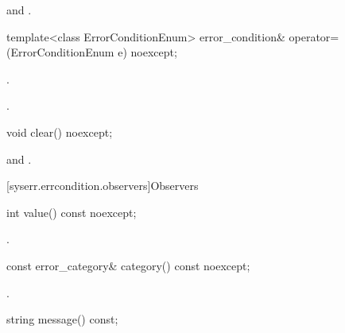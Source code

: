 \begin{itemdescr}
\pnum
\ensures {} and .
\end{itemdescr}

%
\begin{itemdecl}
template<class ErrorConditionEnum>
  error_condition& operator=(ErrorConditionEnum e) noexcept;
\end{itemdecl}

\begin{itemdescr}
\pnum
\ensures {}.

\pnum
\returns {}.

\pnum
{}

\end{itemdescr}

%
\begin{itemdecl}
void clear() noexcept;
\end{itemdecl}

\begin{itemdescr}
\pnum
\ensures {} and .
\end{itemdescr}

[syserr.errcondition.observers]{Observers}

%
\begin{itemdecl}
int value() const noexcept;
\end{itemdecl}

\begin{itemdescr}
\pnum
\returns {}.
\end{itemdescr}

%
\begin{itemdecl}
const error_category& category() const noexcept;
\end{itemdecl}

\begin{itemdescr}
\pnum
\returns {}.
\end{itemdescr}

%
\begin{itemdecl}
string message() const;
\end{itemdecl}

